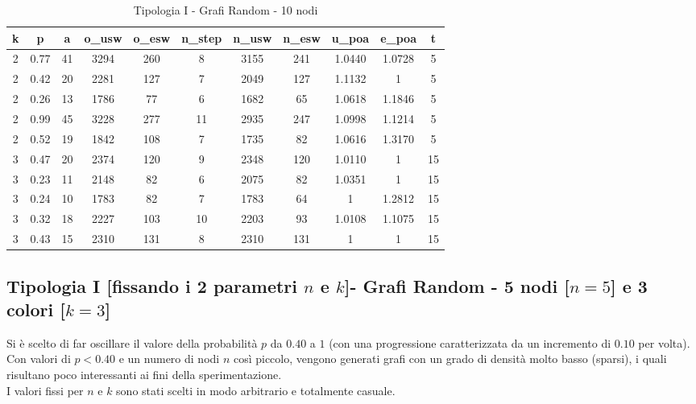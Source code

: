 \begin{table}[H]
\centering
\scalebox{0.9} {
\begin{tabular}{|c|c|c|c|c|c|c|c|c|c|c|}
\hline
\textbf{k} & \textbf{p} & \textbf{a} & \textbf{o\_usw} & \textbf{o\_esw} & \textbf{n\_step} & \textbf{n\_usw} & \textbf{n\_esw} & \textbf{u\_poa} & \textbf{e\_poa} & \textbf{t} \\ \hline
2 & 0.77 & 41 & 3294 & 260 & 8 & 3155 & 241 & 1.0440 & 1.0728 & 5 \\ \hline
2 & 0.42 & 20 & 2281 & 127 & 7 & 2049 & 127 & 1.1132 & 1 & 5 \\ \hline
2 & 0.26 & 13 & 1786 & 77 & 6 & 1682 & 65 & 1.0618 & 1.1846 & 5 \\ \hline
2 & 0.99 & 45 & 3228 & 277 & 11 & 2935 & 247 & 1.0998 & 1.1214 & 5 \\ \hline
2 & 0.52 & 19 & 1842 & 108 & 7 & 1735 & 82 & 1.0616 & 1.3170 & 5 \\ \hline
3 & 0.47 & 20 & 2374 & 120 & 9 & 2348 & 120 & 1.0110 & 1 & 15 \\ \hline
3 & 0.23 & 11 & 2148 & 82 & 6 & 2075 & 82 & 1.0351 & 1 & 15 \\ \hline
3 & 0.24 & 10 & 1783 & 82 & 7 & 1783 & 64 & 1 & 1.2812 & 15 \\ \hline
3 & 0.32 & 18 & 2227 & 103 & 10 & 2203 & 93 & 1.0108 & 1.1075 & 15 \\ \hline
3 & 0.43 & 15 & 2310 & 131 & 8 & 2310 & 131 & 1 & 1 & 15 \\ \hline
\end{tabular}
}
\caption{Tipologia I - Grafi Random - 10 nodi}
\label{tab:sperimentazione-tipo1-10nodi}
\end{table}

\subsection{Tipologia I [fissando i 2 parametri $n$ e $k$]- Grafi Random - 5 nodi [$n=5$] e 3 colori [$k=3$]}
Si è scelto di far oscillare il valore della probabilità $p$ da $0.40$ a $1$ (con una progressione caratterizzata da un incremento di $0.10$ per volta). Con valori di \(p<0.40\) e un numero di nodi $n$ così piccolo, vengono generati grafi con un grado di densità molto basso (sparsi), i quali risultano poco interessanti ai fini della sperimentazione.\\
I valori fissi per $n$ e $k$ sono stati scelti in modo arbitrario e totalmente casuale.

